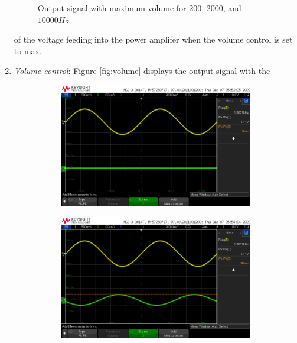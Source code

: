 \documentclass[notitlepage, 12pt]{report}
\begin{document}
\begin{enumerate}
\begin{figure}
        \caption{Output signal with maximum volume for 200, 2000, and $10000Hz$}
        \label{fig:maxvolume}
    \end{figure}
    of the voltage feeding into the power amplifer when the volume control is set to max. 
    \item \emph{Volume control}: Figure \ref{fig:volume} displays the output signal with the 
    \begin{figure}    
        \begin{subfigure}{0.3\textwidth}
            \includegraphics[scale=0.2]{images/lowvolume.png}
        \end{subfigure}
        \hfill
        \begin{subfigure}{0.3\textwidth}
            \includegraphics[scale=0.2]{images/medvolume.png}
        \end{subfigure}
        \hfill
        \begin{subfigure}{0.3\textwidth}

\end{subfigure}
\end{figure}
\end{enumerate}
\end{document}
